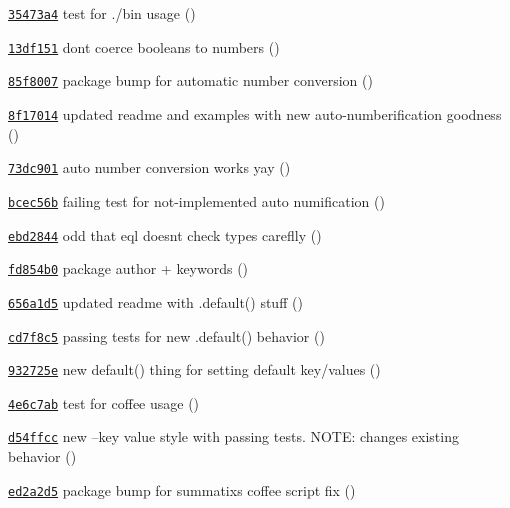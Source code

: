 \begin{DoxyItemize}
\item \href{https://github.com/bcoe/yargs/commit/35473a4d93a45e5e7e512af8bb54ebb532997ae1}{\tt 35473a4} test for ./bin usage ()
\item \href{https://github.com/bcoe/yargs/commit/13df151e44228eed10e5441c7cd163e086c458a4}{\tt 13df151} don\textquotesingle{}t coerce booleans to numbers ()
\item \href{https://github.com/bcoe/yargs/commit/85f8007e93b8be7124feea64b1f1916d8ba1894a}{\tt 85f8007} package bump for automatic number conversion ()
\item \href{https://github.com/bcoe/yargs/commit/8f170141cded4ccc0c6d67a849c5bf996aa29643}{\tt 8f17014} updated readme and examples with new auto-\/numberification goodness ()
\item \href{https://github.com/bcoe/yargs/commit/73dc9011ac968e39b55e19e916084a839391b506}{\tt 73dc901} auto number conversion works yay ()
\item \href{https://github.com/bcoe/yargs/commit/bcec56b3d031e018064cbb691539ccc4f28c14ad}{\tt bcec56b} failing test for not-\/implemented auto numification ()
\item \href{https://github.com/bcoe/yargs/commit/ebd2844d683feeac583df79af0e5124a7a7db04e}{\tt ebd2844} odd that eql doesn\textquotesingle{}t check types careflly ()
\item \href{https://github.com/bcoe/yargs/commit/fd854b02e512ce854b76386d395672a7969c1bc4}{\tt fd854b0} package author + keywords ()
\item \href{https://github.com/bcoe/yargs/commit/656a1d5a1b7c0e49d72e80cb13f20671d56f76c6}{\tt 656a1d5} updated readme with .default() stuff ()
\item \href{https://github.com/bcoe/yargs/commit/cd7f8c55f0b82b79b690d14c5f806851236998a1}{\tt cd7f8c5} passing tests for new .default() behavior ()
\item \href{https://github.com/bcoe/yargs/commit/932725e39ce65bc91a0385a5fab659a5fa976ac2}{\tt 932725e} new default() thing for setting default key/values ()
\item \href{https://github.com/bcoe/yargs/commit/4e6c7aba6374ac9ebc6259ecf91f13af7bce40e3}{\tt 4e6c7ab} test for coffee usage ()
\item \href{https://github.com/bcoe/yargs/commit/d54ffccf2a5a905f51ed5108f7c647f35d64ae23}{\tt d54ffcc} new --key value style with passing tests. N\+O\+TE\+: changes existing behavior ()
\item \href{https://github.com/bcoe/yargs/commit/ed2a2d5d828100ebeef6385c0fb88d146a5cfe9b}{\tt ed2a2d5} package bump for summatix\textquotesingle{}s coffee script fix ()

\end{DoxyItemize}
